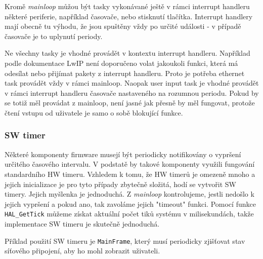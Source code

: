 Kromě \emph{mainloop} můžou být tasky vykonávané ještě v rámci interrupt handleru některé
periferie, například časovače, nebo stisknutí tlačítka.
Interrupt handlery mají obecně tu výhodu, že jsou spuštěny vždy po určité události -
v případě časovače je to uplynutí periody.

Ne všechny tasky je vhodné provádět v kontextu interrupt handleru.
Například podle dokumentace LwIP není doporučeno volat jakoukoli funkci, která má odesílat
nebo přijímat pakety z interrupt handleru.
Proto je potřeba ethernet task provádět vždy v rámci mainloop.
Naopak user input task je vhodné provádět v rámci interrupt handleru časovače nastaveného
na rozumnou periodu.
Pokud by se totiž měl provádat z mainloop, není jasné jak přesně by měl fungovat, protože čtení
vstupu od uživatele je samo o sobě blokující funkce.

\subsubsection{SW timer}
Některé komponenty firmware musejí být periodicky notifikovány o vypršení určitého časového intervalu.
V podstatě by takové komponenty využili fungování standardního HW timeru.
Vzhledem k tomu, že HW timerů je omezeně mnoho a jejich inicializace je pro tyto případy zbytečně složitá,
hodí se vytvořit SW timery.
Jejich myšlenka je jednoduchá.
Z \emph{mainloop} kontrolujeme, jestli nedošlo k jejich vypršení a pokud ano, tak zavoláme jejich
"timeout" funkci.
Pomocí funkce \texttt{HAL\_GetTick} můžeme získat aktuální počet tiků systému v milisekundách, takže
implementace SW timeru je skutečně jednoduchá.

Příklad použití SW timeru je \texttt{MainFrame}, který musí periodicky zjišťovat stav síťového
připojení, aby ho mohl zobrazit uživateli.

